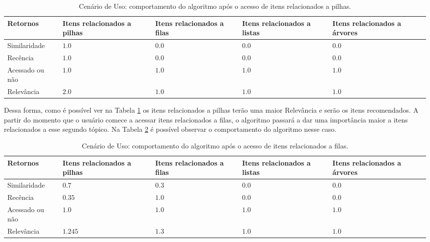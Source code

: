 \begin{table}[h]
\footnotesize
\caption[Cenário de Uso: comportamento do algoritmo após o acesso de itens relacionados a pilhas.]{Cenário de Uso: comportamento do algoritmo após o acesso de itens relacionados a pilhas.}
\label{tab:cenario-de-uso-1}
\centering
\begin{tabular}{|p{2cm}|p{2.5cm}|p{2.5cm}|p{2.5cm}|p{2.5cm}|}
  \hline
  \textbf{Retornos} & \textbf{Itens relacionados a pilhas} & \textbf{Itens relacionados a filas} & \textbf{Itens relacionados a listas} & \textbf{Itens relacionados a árvores} \\
  \hline
  Similaridade & $1.0$ & $0.0$ & $0.0$ & $0.0$ \\
  \hline
  Recência & $1.0$ & $0.0$ & $0.0$ & $0.0$ \\
  \hline
  Acessado ou não & $1.0$ & $1.0$ & $1.0$ & $1.0$ \\
  \hline
  Relevância & $2.0$ & $1.0$ & $1.0$ & $1.0$ \\
  \hline
\end{tabular}
\end{table}

Dessa forma, como é possível ver na Tabela \ref{tab:cenario-de-uso-1} os itens relacionados a pilhas terão uma maior Relevância e serão os itens recomendados.
A partir do momento que o usuário comece a acessar itens relacionados a filas, o algoritmo passará a dar uma importância
maior a itens relacionados a esse segundo tópico. Na Tabela \ref{tab:cenario-de-uso-2} é possível observar o
comportamento do algoritmo nesse caso.

\begin{table}[h]
\footnotesize
\caption[Cenário de Uso: comportamento do algoritmo após o acesso de itens relacionados a filas.]{Cenário de Uso: comportamento do algoritmo após o acesso de itens relacionados a filas.}
\label{tab:cenario-de-uso-2}
\centering
\begin{tabular}{|p{2cm}|p{2.5cm}|p{2.5cm}|p{2.5cm}|p{2.5cm}|}
  \hline
  \textbf{Retornos} & \textbf{Itens relacionados a pilhas} & \textbf{Itens relacionados a filas} & \textbf{Itens relacionados a listas} & \textbf{Itens relacionados a árvores} \\
  \hline
  Similaridade & $0.7$ & $0.3$ & $0.0$ & $0.0$ \\
  \hline
  Recência & $0.35$ & $1.0$ & $0.0$ & $0.0$ \\
  \hline
  Acessado ou não & $1.0$ & $1.0$ & $1.0$ & $1.0$ \\
  \hline
  Relevância & $1.245$ & $1.3$ & $1.0$ & $1.0$ \\
  \hline
\end{tabular}
\end{table}

